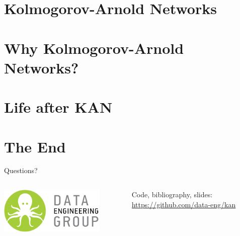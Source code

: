\documentclass[10pt, aspectratio=169]{beamer}
\begin{document}




\section{Kolmogorov-Arnold Networks}
{
  \begin{frame}
    \sectionpage%
  \end{frame}
}




\section{Why Kolmogorov-Arnold Networks?}
{
  \begin{frame}
    \sectionpage%
  \end{frame}
}



\section{Life after KAN}
{
  \begin{frame}
    \sectionpage%
  \end{frame}
}





\section{The End}

\begin{frame}

\begin{center}
  \huge {} 
  Questions?
\end{center}

\vfill

\begin{columns}
\begin{column}{6cm}
\includegraphics[width=5cm]{fqsstyle/assets/deg} \\
\end{column}
\begin{column}{6cm}
Code, bibliography, slides:\\
\url{https://github.com/data-eng/kan}
\end{column}
\end{columns}

\end{frame}
\end{document}
